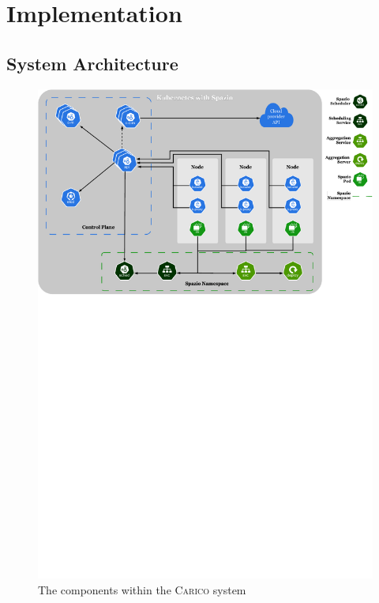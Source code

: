 \chapter{Implementation}

\section{System Architecture}
\label{sec:sys-arch}

\begin{figure}[ht!]
    \centering
    \includegraphics[width=\textwidth]{images/carico-svg.pdf}
    \caption{The components within the \textsc{Carico} system}
    \label{fig:spazio-system}
\end{figure}

